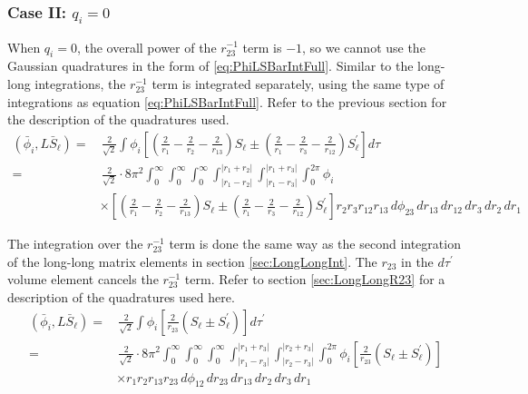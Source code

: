 \documentclass[Dissertation.tex]{subfiles}
\begin{document}
\subsubsection{Case II: \texorpdfstring{$q_i = 0$}{qi = 0}}
When $q_i = 0$, the overall power of the $r_{23}^{-1}$ term is $-1$, so we cannot use the Gaussian quadratures in the form of \ref{eq:PhiLSBarIntFull}.  Similar to the long-long integrations, the $r_{23}^{-1}$ term is integrated separately, using the same type of integrations as equation \ref{eq:PhiLSBarIntFull}.  Refer to the previous section for the description of the quadratures used.
\begin{align}
\label{eq:PhiLSBarIntNoR23}
\nonumber (\bar{\phi}_i, L\bar{S}_\ell) =& \,\frac{2}{\sqrt{2}} \int \phi_i \left[ \left( \frac{2}{r_1} - \frac{2}{r_2} - \frac{2}{r_{13}} \right)S_\ell \pm \left( \frac{2}{r_1} - \frac{2}{r_3} - \frac{2}{r_{12}} \right) S_\ell^\prime \right]  d\tau \\
\nonumber =&\, \frac{2}{\sqrt{2}} \cdot 8\pi^2  \int_0^\infty \int_0^\infty \int_0^\infty \int_{|r_1 - r_2|}^{|r_1 + r_2|} \int_{|r_1 - r_3|}^{|r_1 + r_3|} \int_0^{2\pi} \phi_i \\
&\times \left[ \left( \frac{2}{r_1} - \frac{2}{r_2} - \frac{2}{r_{13}} \right)S_\ell \pm \left( \frac{2}{r_1} - \frac{2}{r_3} - \frac{2}{r_{12}} \right) S_\ell^\prime \right]  r_2 r_3 r_{12} r_{13}\, d\phi_{23}\, dr_{13}\, dr_{12}\, dr_3\, dr_2\, dr_1
\end{align}

The integration over the $r_{23}^{-1}$ term is done the same way as the second integration of the long-long matrix elements in section \ref{sec:LongLongInt}.  The $r_{23}$ in the $d\tau^\prime$ volume element cancels the $r_{23}^{-1}$ term.  Refer to section \ref{sec:LongLongR23} for a description of the quadratures used here.
\begin{align}
\label{eq:PhiLSBarIntR23}
(\bar{\phi}_i, L\bar{S}_\ell) =& \,\frac{2}{\sqrt{2}} \int \phi_i \left[ \frac{2}{r_{23}}\left(S_\ell \pm S_\ell^\prime\right) \right] d\tau^\prime  \nonumber \\
=&\, \frac{2}{\sqrt{2}} \cdot 8\pi^2  \int_0^\infty \int_0^\infty \int_0^\infty \int_{|r_1 - r_3|}^{|r_1 + r_3|} \int_{|r_2 - r_3|}^{|r_2 + r_3|} \int_0^{2\pi} \phi_i \left[ \frac{2}{r_{23}}\left(S_\ell \pm S_\ell^\prime\right) \right]  \nonumber \\
&\times  r_1 r_2 r_{13} r_{23}\, d\phi_{12}\, dr_{23}\, dr_{13}\, dr_2\, dr_3\, dr_1
\end{align}
\end{document}
